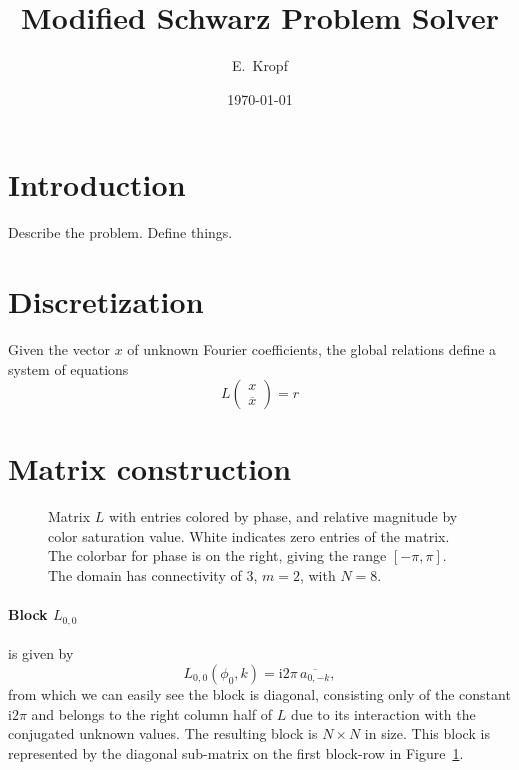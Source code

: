 \documentclass[12pt,a4paper,fleqn]{article}
\title{Modified Schwarz Problem Solver}
\author{E.~Kropf}
\date{\today}
\newcommand{\conj}[1]{\overline{#1}}
\renewcommand{\i}{\mathrm{i}}
\begin{document}
\maketitle

\section{Introduction}
Describe the problem. Define things.

\section{Discretization}
Given the vector $x$ of unknown Fourier coefficients, the global relations define a system of equations
\begin{equation}
  L
  \begin{pmatrix}
    x \\
    \conj{x}
  \end{pmatrix}
  = r
  \label{eq:base_linear_system}
\end{equation}

\section{Matrix construction}
\begin{figure}[htbp]
  \centering
  \caption{Matrix $L$ with entries colored by phase, and relative magnitude by color saturation value. White indicates zero entries of the matrix. The colorbar for phase is on the right, giving the range $[-\pi,\pi]$. The domain has connectivity of 3, $m = 2$, with $N = 8$.}
  \label{fig:L_matrix}
\end{figure}

\paragraph{Block $L_{0,0}$} is given by
\begin{equation}
  L_{0,0}(\phi_0,k) = \i2\pi \,\conj{a_{0,-k}},
  \label{eq:block_L00}
\end{equation}
from which we can easily see the block is diagonal, consisting only of the constant $\i2\pi$ and belongs to the right column half of $L$ due to its interaction with the conjugated unknown values. The resulting block is $N\times N$ in size. This block is represented by the diagonal sub-matrix on the first block-row in Figure~\ref{fig:L_matrix}.
\end{document}

